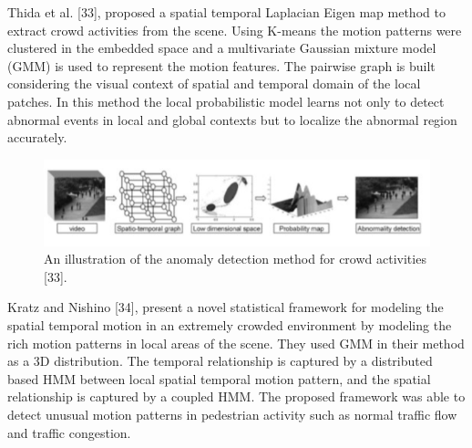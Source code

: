 Thida et al. [33], proposed a spatial temporal Laplacian Eigen map method to extract crowd activities from the scene. Using K-means the motion patterns were clustered in the embedded space and a multivariate Gaussian mixture model (GMM) is used to represent the motion features. The pairwise graph is built considering the visual context of spatial and temporal domain of the local patches. In this method the local probabilistic model learns not only to detect abnormal events in local and global contexts but to localize the abnormal region accurately.
\begin{figure}[ht]
\centering
\includegraphics{Figures/add}
\decoRule
\caption[An illustration of the anomaly detection method for crowd activities "33".]{An illustration of the anomaly detection method for crowd activities [33].}
\label{fig:la}
\end{figure}
\newpage
Kratz and Nishino [34], present a novel statistical framework for modeling the spatial temporal motion in an extremely crowded environment by modeling the rich motion patterns in local areas of the scene. They used GMM in their method as a 3D distribution. The temporal relationship is captured by a distributed based HMM between local spatial temporal motion pattern, and the spatial relationship is captured by a coupled HMM. The proposed framework was able to detect unusual motion patterns in pedestrian activity such as normal traffic flow and traffic congestion.\\

